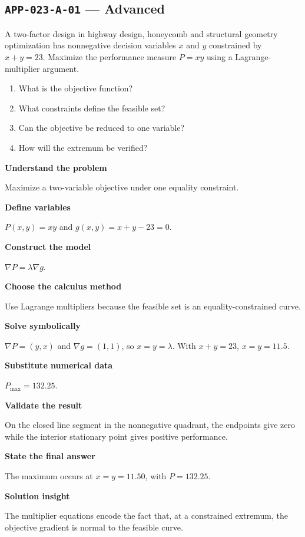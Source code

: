 \documentclass[11pt]{book}
\newcommand{\pid}[1]{\texttt{#1}}
\begin{document}
\subsection*{\pid{APP-023-A-01} — Advanced}
\begin{problembox}
A two-factor design in highway design, honeycomb and structural geometry optimization has nonnegative decision variables $x$ and $y$ constrained by $x+y=23$. Maximize the performance measure $P=xy$ using a Lagrange-multiplier argument.
\end{problembox}
\begin{promptbox}\begin{enumerate}
\item What is the objective function?
\item What constraints define the feasible set?
\item Can the objective be reduced to one variable?
\item How will the extremum be verified?
\end{enumerate}\end{promptbox}
\begin{solutionbox}
\textbf{Understand the problem}\par Maximize a two-variable objective under one equality constraint.\par\medskip
\textbf{Define variables}\par $P(x,y)=xy$ and $g(x,y)=x+y-23=0$.\par\medskip
\textbf{Construct the model}\par $\nabla P=\lambda\nabla g$.\par\medskip
\textbf{Choose the calculus method}\par Use Lagrange multipliers because the feasible set is an equality-constrained curve.\par\medskip
\textbf{Solve symbolically}\par $\nabla P=(y,x)$ and $\nabla g=(1,1)$, so $x=y=\lambda$. With $x+y=23$, $x=y=11.5$.\par\medskip
\textbf{Substitute numerical data}\par $P_{\max}=132.25$.\par\medskip
\textbf{Validate the result}\par On the closed line segment in the nonnegative quadrant, the endpoints give zero while the interior stationary point gives positive performance.\par\medskip
\textbf{State the final answer}\par The maximum occurs at $x=y=11.50$, with $P=132.25$.\par\medskip
\textbf{Solution insight}\par The multiplier equations encode the fact that, at a constrained extremum, the objective gradient is normal to the feasible curve.\par\medskip
\end{solutionbox}
\end{document}
